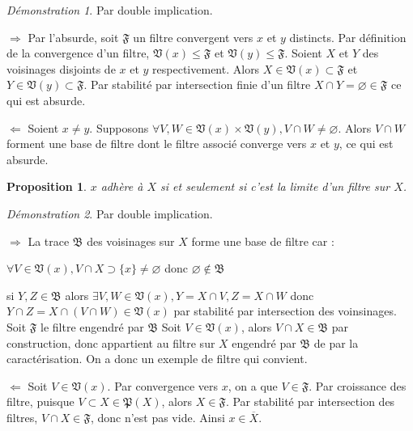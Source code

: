 \documentclass[a4paper, 11pt, french]{book}
\newenvironment{itemise}{\itemize}{\enditemize}
\theoremstyle{plain} %
\newtheorem{proposition}{Proposition}
\theoremstyle{definition} %
\theoremstyle{remark} %
\newtheorem*{demonstration}{Démonstration}
\newcommand{\1}{\mathds{1}}
\newcommand\vide{\varnothing}
\newcommand{\infegal}{\leqslant}
\begin{document}
\begin{demonstration}
	Par double implication.
	\begin{itemise}
		\item[$\Rightarrow$] Par l'absurde, soit $\mathfrak{F}$ un filtre convergent vers $x$ et $y$ distincts.
		Par définition de la convergence d'un filtre, $\mathfrak{V}(x)\infegal\mathfrak{F}$ et $\mathfrak{V}(y)\infegal\mathfrak{F}$.
		Soient $X$ et $Y$ des voisinages disjoints de $x$ et $y$ respectivement.
		Alors $X\in\mathfrak{V}(x)\subset\mathfrak{F}$ et $Y\in\mathfrak{V}(y)\subset\mathfrak{F}$.
		Par stabilité par intersection finie d'un filtre $X\cap Y=\vide\in\mathfrak{F}$ ce qui est absurde.
		\item[$\Leftarrow$] Soient $x\neq y$.
		Supposons $\forall V, W\in\mathfrak{V}(x)\times\mathfrak{V}(y), V\cap W\neq\vide$.
		Alors $V\cap W$ forment une base de filtre dont le filtre associé converge vers $x$ et $y$, ce qui est absurde.
	\end{itemise}
\end{demonstration}

\begin{proposition}
	$x$ adhère à $X$ si et seulement si c'est la limite d'un filtre sur $X$.
\end{proposition}

\begin{demonstration}
	Par double implication.
	\begin{itemise}
		\item[$\Rightarrow$] La trace $\mathfrak{B}$ des voisinages sur $X$ forme une base de filtre car :
		\begin{itemise}
			\item $\forall V\in\mathfrak{V}(x), V\cap X\supset\{x\}\neq\vide$ donc $\vide\notin\mathfrak{B}$
			\item si $Y, Z\in\mathfrak{B}$ alors $\exists V, W\in\mathfrak{V}(x), Y=X\cap V, Z=X\cap W$ donc $Y\cap Z=X\cap(V\cap W)\in\mathfrak{V}(x)$ par stabilité par intersection des voinsinages.
		\end{itemise}
		Soit $\mathfrak{F}$ le filtre engendré par $\mathfrak{B}$
		Soit $V\in\mathfrak{V}(x)$, alors $V\cap X\in\mathfrak{B}$ par construction, donc appartient au filtre sur $X$ engendré par $\mathfrak{B}$ de par la caractérisation.
		On a donc un exemple de filtre qui convient.
		\item[$\Leftarrow$] Soit $V\in\mathfrak{V}(x)$.
		Par convergence vers $x$, on a que $V\in\mathfrak{F}$.
		Par croissance des filtre, puisque $V\subset X\in\mathfrak{P}(X)$, alors $X\in\mathfrak{F}$.
		Par stabilité par intersection des filtres, $V\cap X\in\mathfrak{F}$, donc n'est pas vide.
		Ainsi $x\in\overline{X}$.
	\end{itemise}
\end{demonstration}
\end{document}
